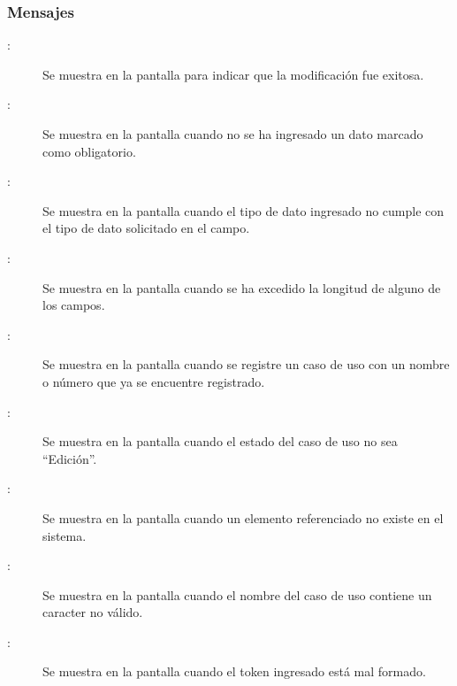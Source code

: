 \subsubsection{Mensajes}

	
\begin{description}
			\item[:] Se muestra en la pantalla  para indicar que la modificación fue exitosa.
	
			\item[:] Se muestra en la pantalla  cuando no se ha ingresado un dato marcado como obligatorio.
			\item[:] Se muestra en la pantalla  cuando el tipo de dato ingresado no cumple con el tipo de dato solicitado en el campo.
			\item[:] Se muestra en la pantalla  cuando se ha excedido la longitud de alguno de los campos.
			\item[:] Se muestra en la pantalla  cuando se registre un caso de uso con un nombre o número que ya se encuentre registrado.
			\item[:] Se muestra en la pantalla  cuando el estado del caso de uso no sea ``Edición''.
			\item[:] Se muestra en la pantalla  cuando un elemento referenciado no existe en el sistema.
			\item[:] Se muestra en la pantalla  cuando el nombre del caso de uso contiene un caracter no válido.
			\item[:] Se muestra en la pantalla  cuando el token ingresado está mal formado.
\end{description}
